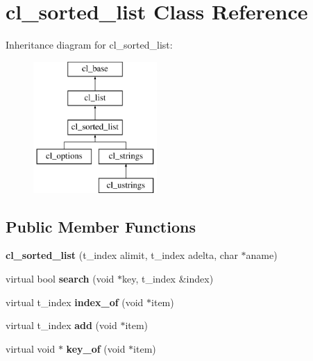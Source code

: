 \hypertarget{classcl__sorted__list}{
\section{cl\_\-sorted\_\-list Class Reference}
\label{classcl__sorted__list}
}
Inheritance diagram for cl\_\-sorted\_\-list:\begin{figure}[H]
\begin{center}
\leavevmode
\includegraphics[height=5.000000cm]{classcl__sorted__list}
\end{center}
\end{figure}
\subsection*{Public Member Functions}
\begin{DoxyCompactItemize}
\item 
\hypertarget{classcl__sorted__list_aeb2749fd5bc66a8ea16036e232a531c6}{
{\bfseries cl\_\-sorted\_\-list} (t\_\-index alimit, t\_\-index adelta, char $\ast$aname)}
\label{classcl__sorted__list_aeb2749fd5bc66a8ea16036e232a531c6}

\item 
\hypertarget{classcl__sorted__list_a2a9833376b478fe35673920f53fe890a}{
virtual bool {\bfseries search} (void $\ast$key, t\_\-index \&index)}
\label{classcl__sorted__list_a2a9833376b478fe35673920f53fe890a}

\item 
\hypertarget{classcl__sorted__list_a568582e61a301cdb7692924dbee0b81c}{
virtual t\_\-index {\bfseries index\_\-of} (void $\ast$item)}
\label{classcl__sorted__list_a568582e61a301cdb7692924dbee0b81c}

\item 
\hypertarget{classcl__sorted__list_ac9fbd7c30b40311a02e6a8cfe712e1ad}{
virtual t\_\-index {\bfseries add} (void $\ast$item)}
\label{classcl__sorted__list_ac9fbd7c30b40311a02e6a8cfe712e1ad}

\item 
\hypertarget{classcl__sorted__list_a9b831b68854f23c2f38c05b660f9a3a3}{
virtual void $\ast$ {\bfseries key\_\-of} (void $\ast$item)}
\label{classcl__sorted__list_a9b831b68854f23c2f38c05b660f9a3a3}

\end{DoxyCompactItemize}
